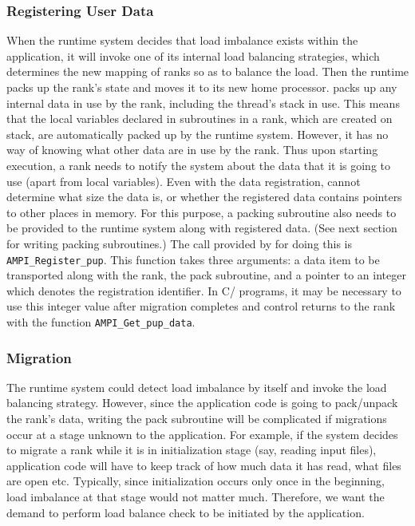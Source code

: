 \documentclass[10pt]{article}
\begin{document}
\subsubsection{Registering User Data}

When the \ampi{} runtime system decides that load imbalance exists within the
application, it will invoke one of its internal load balancing strategies,
which determines the new mapping of \ampi{} ranks so as to balance the load.
Then the \ampi{} runtime packs up the rank's state and moves it to its new
home processor. \ampi{} packs up any internal data in use by the rank,
including the thread's stack in use. This means that the local variables
declared in subroutines in a rank, which are created on stack, are
automatically packed up by the \ampi{} runtime system. However, it has no way
of knowing what other data are in use by the rank. Thus upon starting
execution, a rank needs to notify the system about the data that it is going
to use (apart from local variables). Even with the data registration, \ampi{}
cannot determine what size the data is, or whether the registered data contains
pointers to other places in memory. For this purpose, a packing subroutine also
needs to be provided to the \ampi{} runtime system along with registered data.
(See next section for writing packing subroutines.) The call provided by
\ampi{} for doing this is \texttt{AMPI\_Register\_pup}. This function takes three
arguments: a data item to be transported along with the rank, the pack
subroutine, and a pointer to an integer which denotes the registration identifier.
In C/\CC{} programs, it may be necessary to use this integer value after migration
completes and control returns to the rank with the function
\texttt{AMPI\_Get\_pup\_data}.

\subsubsection{Migration}

The \ampi{} runtime system could detect load imbalance by itself and invoke the
load balancing strategy. However, since the application code is going to
pack/unpack the rank's data, writing the pack subroutine will be complicated
if migrations occur at a stage unknown to the application. For example, if the
system decides to migrate a rank while it is in initialization stage (say,
reading input files), application code will have to keep track of how much data
it has read, what files are open etc. Typically, since initialization occurs
only once in the beginning, load imbalance at that stage would not matter much.
Therefore, we want the demand to perform load balance check to be initiated by
the application.
\end{document}
